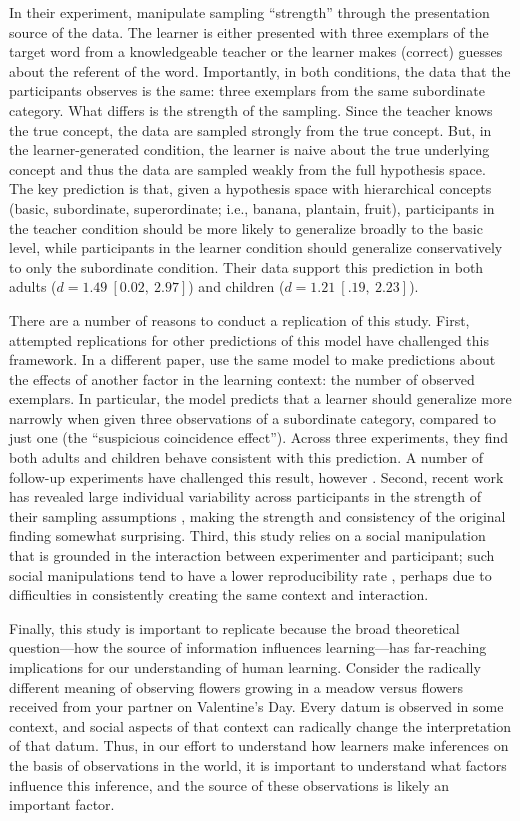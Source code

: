 \documentclass[man]{apa2}
\begin{document}
In their experiment,  manipulate sampling ``strength'' through the presentation source of the data. The learner is either presented with three exemplars of the target word from a knowledgeable teacher or the learner makes (correct) guesses about the referent of the word. Importantly, in both conditions, the data that the participants observes is the same: three exemplars from the same subordinate category. What differs is the strength of the sampling. Since the teacher knows the true concept, the data are sampled strongly from the true concept. But, in the learner-generated condition, the learner is naive about the true underlying concept and thus the data are sampled weakly from the full hypothesis space. The key prediction is that, given a hypothesis space with hierarchical concepts (basic, subordinate, superordinate; i.e., banana, plantain, fruit), participants in the teacher condition should be more likely to generalize broadly to the basic level, while participants in the learner condition should generalize conservatively to only the subordinate condition. Their data support  this prediction in both adults ($d = 1.49\ [0.02,\ 2.97]$) and children ($d = 1.21\ [.19,\ 2.23]$).

There are a number of reasons to conduct a replication of this study. First, attempted replications for other predictions of this model have challenged this framework. In a different paper,  use the same model to make predictions about the effects of another factor in the learning context: the number of observed exemplars. In particular, the model predicts that a learner should generalize more narrowly when given three observations of a subordinate category, compared to just one (the ``suspicious coincidence effect''). Across three experiments, they find both adults and children behave consistent with this prediction. A number of follow-up experiments have challenged this result, however \cite{jenkins2015non,spencer2011}. Second, recent work has revealed large individual variability across participants in the strength of their sampling assumptions \cite{navarro2012sampling}, making the strength and consistency of the original finding somewhat surprising. Third, this study relies on a social manipulation that is grounded in the interaction between experimenter and participant; such social manipulations tend to have a lower reproducibility rate \cite{reproProj2015}, perhaps due to difficulties in consistently creating the same context and interaction.

Finally, this study is important to replicate because the broad theoretical question---how the source of information influences learning---has far-reaching implications for our understanding of human learning. Consider the radically different meaning of observing flowers growing in a meadow versus flowers received from your partner on Valentine's Day. Every datum is observed in some context, and social aspects of that context can radically change the interpretation of that datum. Thus, in our effort to understand how learners make inferences on the basis of observations in the world, it is important to understand what factors influence this inference, and the source of these observations is likely an important factor.
\end{document}
